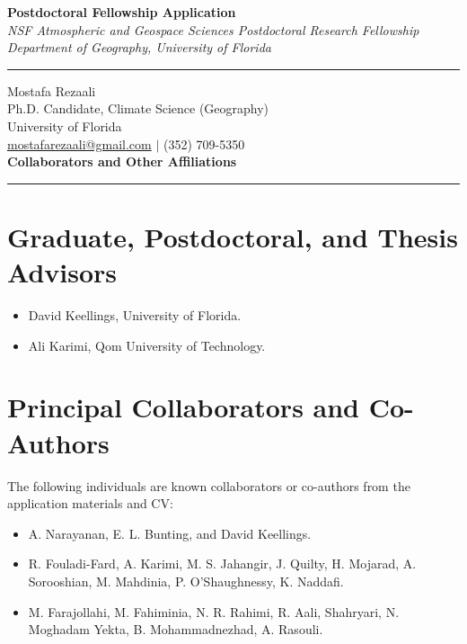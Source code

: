 \documentclass[11pt,letterpaper]{article}
\begin{document}
\begin{center}
    \vspace*{-1.5cm}
    {\Large\bfseries Postdoctoral Fellowship Application} \\[0.2cm]
    {\small\textit{NSF Atmospheric and Geospace Sciences Postdoctoral Research Fellowship}} \\[0.05cm]
    {\small\textit{Department of Geography, University of Florida}} \\[0.1cm]
    \rule{0.6\textwidth}{0.4pt}
\end{center}
\vspace{-0.5cm}

\noindent
Mostafa Rezaali \\
Ph.D. Candidate, Climate Science (Geography) \\
University of Florida \\
\href{mailto:mostafarezaali@gmail.com}{mostafarezaali@gmail.com} \quad $\mid$ \quad (352) 709-5350 \\[0.3cm]
{\large\bfseries Collaborators and Other Affiliations}\\[-0.15cm]
\rule{\textwidth}{0.4pt}
\section*{Graduate, Postdoctoral, and Thesis Advisors}
\begin{itemize}
\item David Keellings, University of Florida.
\item Ali Karimi, Qom University of Technology.
\end{itemize}

\section*{Principal Collaborators and Co-Authors}
The following individuals are known collaborators or co-authors from the application materials and CV:
\begin{itemize}
\item A. Narayanan, E. L. Bunting, and David Keellings.
\item R. Fouladi-Fard, A. Karimi, M. S. Jahangir, J. Quilty, H. Mojarad, A. Sorooshian, M. Mahdinia, P. O'Shaughnessy, K. Naddafi.
\item M. Farajollahi, M. Fahiminia, N. R. Rahimi, R. Aali, Shahryari, N. Moghadam Yekta, B. Mohammadnezhad, A. Rasouli.
\end{itemize}
\end{document}
